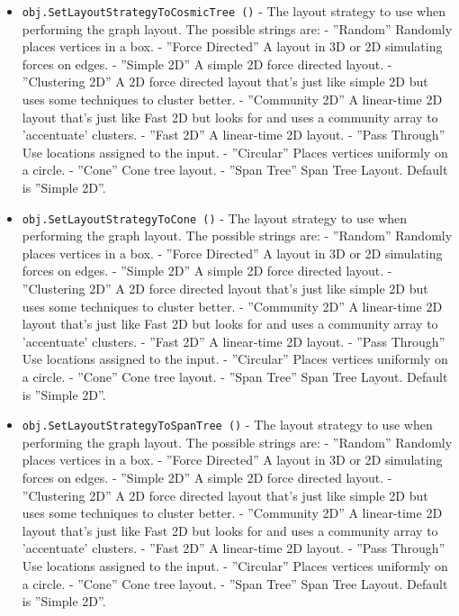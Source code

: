 \begin{itemize}
\item  \verb|obj.SetLayoutStrategyToCosmicTree ()| -  The layout strategy to use when performing the graph layout.
 The possible strings are:
  - ''Random''         Randomly places vertices in a box.
  - ''Force Directed'' A layout in 3D or 2D simulating forces on edges.
  - ''Simple 2D''      A simple 2D force directed layout.
  - ''Clustering 2D''  A 2D force directed layout that's just like
                     simple 2D but uses some techniques to cluster better.
  - ''Community 2D''   A linear-time 2D layout that's just like
                    Fast 2D but looks for and uses a community 
                    array to 'accentuate' clusters.
  - ''Fast 2D''       A linear-time 2D layout.
  - ''Pass Through''  Use locations assigned to the input.
  - ''Circular''      Places vertices uniformly on a circle.
  - ''Cone''          Cone tree layout.
  - ''Span Tree''     Span Tree Layout.
 Default is ''Simple 2D''.

\item  \verb|obj.SetLayoutStrategyToCone ()| -  The layout strategy to use when performing the graph layout.
 The possible strings are:
  - ''Random''         Randomly places vertices in a box.
  - ''Force Directed'' A layout in 3D or 2D simulating forces on edges.
  - ''Simple 2D''      A simple 2D force directed layout.
  - ''Clustering 2D''  A 2D force directed layout that's just like
                     simple 2D but uses some techniques to cluster better.
  - ''Community 2D''   A linear-time 2D layout that's just like
                    Fast 2D but looks for and uses a community 
                    array to 'accentuate' clusters.
  - ''Fast 2D''       A linear-time 2D layout.
  - ''Pass Through''  Use locations assigned to the input.
  - ''Circular''      Places vertices uniformly on a circle.
  - ''Cone''          Cone tree layout.
  - ''Span Tree''     Span Tree Layout.
 Default is ''Simple 2D''.

\item  \verb|obj.SetLayoutStrategyToSpanTree ()| -  The layout strategy to use when performing the graph layout.
 The possible strings are:
  - ''Random''         Randomly places vertices in a box.
  - ''Force Directed'' A layout in 3D or 2D simulating forces on edges.
  - ''Simple 2D''      A simple 2D force directed layout.
  - ''Clustering 2D''  A 2D force directed layout that's just like
                     simple 2D but uses some techniques to cluster better.
  - ''Community 2D''   A linear-time 2D layout that's just like
                    Fast 2D but looks for and uses a community 
                    array to 'accentuate' clusters.
  - ''Fast 2D''       A linear-time 2D layout.
  - ''Pass Through''  Use locations assigned to the input.
  - ''Circular''      Places vertices uniformly on a circle.
  - ''Cone''          Cone tree layout.
  - ''Span Tree''     Span Tree Layout.
 Default is ''Simple 2D''.


\end{itemize}
